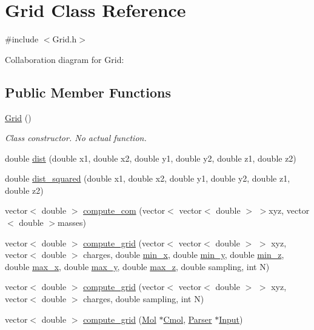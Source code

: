 \hypertarget{classGrid}{
\section{Grid Class Reference}
\label{classGrid}
}


{\ttfamily \#include $<$Grid.h$>$}



Collaboration diagram for Grid:
\subsection*{Public Member Functions}
\begin{DoxyCompactItemize}
\item 
\hyperlink{classGrid_a4ac9ff4f63552b4c61ff90fcb35ad66c}{Grid} ()
\begin{DoxyCompactList}\small\item\em Class constructor. No actual function. \end{DoxyCompactList}\item 
double \hyperlink{classGrid_ada629d223e3a74fa536b5c5c75ed9438}{dist} (double x1, double x2, double y1, double y2, double z1, double z2)
\item 
double \hyperlink{classGrid_a8e159ca3c90ad644d91507c5571f756b}{dist\_\-squared} (double x1, double x2, double y1, double y2, double z1, double z2)
\item 
vector$<$ double $>$ \hyperlink{classGrid_a995b7d957f244276f0b0cb8835fd7e9a}{compute\_\-com} (vector$<$ vector$<$ double $>$ $>$xyz, vector$<$ double $>$masses)
\item 
vector$<$ double $>$ \hyperlink{classGrid_aa4773f2a675a2d42ff1ceb5c3b41ccb9}{compute\_\-grid} (vector$<$ vector$<$ double $>$ $>$ xyz, vector$<$ double $>$ charges, double \hyperlink{classGrid_a16930d1358fd0b70fc84031dbd1b6149}{min\_\-x}, double \hyperlink{classGrid_ac5c22ae5c418071029cd7b4613704be3}{min\_\-y}, double \hyperlink{classGrid_a492df49b72c09feb4e9c5ab2e28ece24}{min\_\-z}, double \hyperlink{classGrid_a72ca32ea381e695f8705fcd3ff248523}{max\_\-x}, double \hyperlink{classGrid_a8f3f3adf7d9a7bfe12f842603fd78787}{max\_\-y}, double \hyperlink{classGrid_a4c93a619b7ef2501f1eb16cb0efc4a09}{max\_\-z}, double sampling, int N)
\item 
vector$<$ double $>$ \hyperlink{classGrid_a9fc3c970a7912ea84f379eb5788345ac}{compute\_\-grid} (vector$<$ vector$<$ double $>$ $>$ xyz, vector$<$ double $>$ charges, double sampling, int N)
\item 
vector$<$ double $>$ \hyperlink{classGrid_a7a4296b76a0f3cc87f7ad21b4c4e9a19}{compute\_\-grid} (\hyperlink{classMol}{Mol} $\ast$\hyperlink{classGrid_ab5087e114551f00fbb0d281b801d3dfc}{Cmol}, \hyperlink{classParser}{Parser} $\ast$\hyperlink{classGrid_aa9824cf9539971c3d32e92532c9c37be}{Input})

\end{DoxyCompactItemize}
